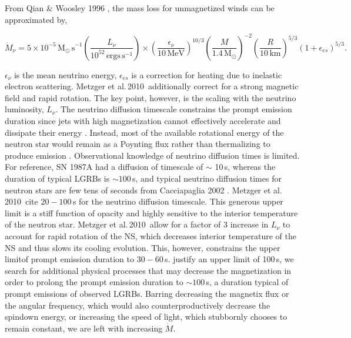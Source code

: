 \documentclass{article}
\begin{document}
From Qian \&  Woosley 1996 \cite{QianWoos:1996ap}, the mass loss for unmagnetized winds can be approximated by,

\begin{equation}
\dot{M}_\nu = 5 \times 10^{-5}\,\mathrm{M_{\odot}\, s}^{-1} \left(\frac{L_\nu}{10^{52}\, \mathrm{ergs\, s}^{-1}}\right) \times \left(\frac{\epsilon_\nu}{10\, \mathrm{MeV}}\right)^{10/3} \left(\frac{M}{1.4\, \mathrm{M}_{\odot}}\right)^{-2} \left(\frac{R}{10\, \mathrm{km}}\right)^{5/3}\left(1+ \epsilon_{es}\right)^{5/3}.
\end{equation}

$\epsilon_\nu$ is the mean neutrino energy, $\epsilon_{es}$ is a correction for heating due to inelastic electron scattering. Metzger et al.\,2010\,\cite{Metzger:2010pp} additionally  correct for a strong magnetic field and rapid rotation.
The key point, however, is the scaling with the neutrino luminosity, $L_\nu$. The neutrino diffusion timescale constrains the prompt emission duration since jets with high magnetization cannot effectively accelerate and dissipate their energy \cite{Metzger:2010pp}. Instead, most of the available rotational energy of the neutron star would remain as a Poynting flux rather than thermalizing to produce emission \cite{Metzger:2010pp}. Observational knowledge of neutrino diffusion times is limited. For reference, SN 1987A had a diffusion of timescale of $\sim$ 10\,s, whereas the duration of typical LGRBs is $\sim 100$\,s, and typical neutrino diffusion times for neutron stars are few tens of seconds from Cacciapaglia 2002 \cite{Cacciapaglia:2002qr}. Metzger et al.\,2010\,\cite{Metzger:2010pp} cite $20-100$\,s for the neutrino diffusion timescale. This generous upper limit is a stiff function of opacity and highly sensitive to the interior temperature of the neutron star. Metzger et al.\,2010\,\cite{Metzger:2010pp} allow for a factor of 3 increase in $L_\nu$ to account for rapid rotation of the NS, which decreases interior temperature of the NS and thus slows its cooling evolution. This, however, constrains the upper limitof prompt emission duration to $30-60$\,s. justify an upper limit of 100\,s, we search for additional physical processes that may decrease the magnetization in order to prolong the prompt emission duration to $\sim 100$\,s, a duration typical of prompt emissions of observed LGRBs. Barring decreasing the magnetix flux or the angular frequency, which would also counterproductively decrease the spindown energy, or increasing the speed of light, which stubbornly chooses to remain constant,  we are left with increasing $\dot{M}$. 
\end{document}
